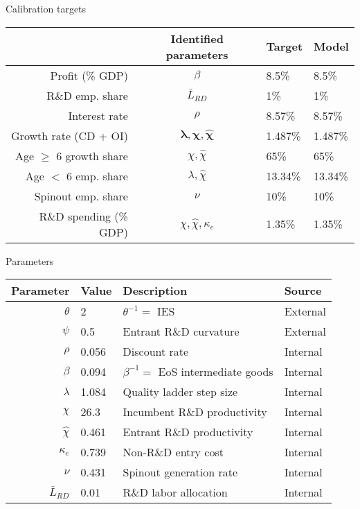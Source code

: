 \documentclass[english,usenames,dvipsnames]{beamer}
\begin{document}
\begin{frame}{Calibration targets}\label{calibration_targets}
	\hyperlink{calibration_overview}{} 
	\begin{table}[]
		\centering
		\small
		\begin{tabular}{rcll}
			\toprule \toprule
			& Identified parameters & Target & Model \tabularnewline
			\midrule
			Profit (\% GDP) & $\beta$ & 8.5\% & 8.5\% 
			\tabularnewline
			R\&D emp. share & $\bar{L}_{RD}$ & 1\% & 1\% 
			\tabularnewline
			Interest rate & $\rho$ & 8.57\% & 8.57\% 
			\tabularnewline
			Growth rate (CD + OI) & $\mathbf{\lambda, \chi, \hat{\chi}}$ & 1.487\% & 1.487\%
			\tabularnewline		
			Age $\ge$ 6 growth share & $\chi, \hat{\chi}$  & 65\% & 65\%
			\tabularnewline
			Age $<$ 6 emp. share  & $\lambda, \hat{\chi}$ & 13.34\% & 13.34\%
			\tabularnewline
			Spinout emp. share &$\nu$  & 10\% & 10\%
			\tabularnewline
			R\&D spending (\% GDP) & $\chi, \hat{\chi}, \kappa_e$  & 1.35\% & 1.35\%
			\tabularnewline
			\bottomrule
		\end{tabular}
	\end{table}
\end{frame}


\begin{frame}{Parameters}\label{parameters}
	\hyperlink{calibration_overview}{} 
	\begin{table}[]
		\footnotesize
		\centering
		\label{calibration_parameters}
		\begin{tabular}{rlll}
			\toprule \toprule
			Parameter & Value & Description & Source \tabularnewline
			\midrule
			$\theta$ & 2 & $\theta^{-1} = $ IES & External
			\tabularnewline
			$\psi$ & 0.5 & Entrant R\&D curvature & External \tabularnewline
			$\rho$ & 0.056 & Discount rate  & Internal \tabularnewline
			$\beta$ & 0.094 & $\beta^{-1} = $ EoS intermediate goods & Internal \tabularnewline 
			$\lambda$ & 1.084 & Quality ladder step size & Internal
			\tabularnewline
			$\chi$ & 26.3 & Incumbent R\&D productivity & Internal
			\tabularnewline
			$\hat{\chi}$ & 0.461 & Entrant R\&D productivity & Internal \tabularnewline 
			$\kappa_e$ & 0.739 & Non-R\&D entry cost & Internal \tabularnewline
			$\nu$ & 0.431 & Spinout generation rate  & Internal \tabularnewline
			$\bar{L}_{RD}$ & 0.01 & R\&D labor allocation  & Internal \tabularnewline
			\bottomrule
		\end{tabular}
	\end{table}
	\hyperlink{identification}{} 
\end{frame}
\end{document}

